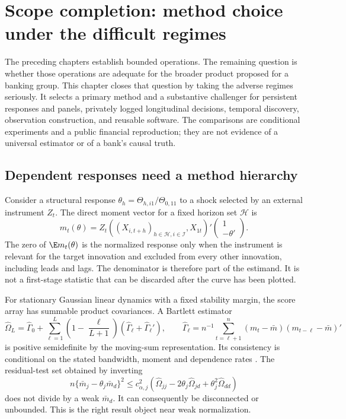 \chapter{Scope completion: method choice under the difficult regimes}
\label{ch:scope-completion}

The preceding chapters establish bounded operations. The remaining question is
whether those operations are adequate for the broader product proposed for a
banking group. This chapter closes that question by taking the adverse regimes
seriously. It selects a primary method and a substantive challenger for
persistent responses and panels, privately logged longitudinal decisions,
temporal discovery, observation construction, and reusable software. The
comparisons are conditional experiments and a public financial reproduction;
they are not evidence of a universal estimator or of a bank's causal truth.

\section{Dependent responses need a method hierarchy}
\label{s5:dependent-hierarchy}

Consider a structural response $\theta_h=\Theta_{h,i1}/\Theta_{0,11}$ to a
shock selected by an external instrument $Z_t$. The direct moment vector for a
fixed horizon set $\mathcal H$ is
\[
 m_t(\theta)=Z_t\left((X_{i,t+h})_{h\in\mathcal H,i\in\mathcal I},
 X_{1t}\right)'\begin{pmatrix}1\\-\theta'\end{pmatrix}.
\]
The zero of $\E m_t(\theta)$ is the normalized response only when the
instrument is relevant for the target innovation and excluded from every
other innovation, including leads and lags. The denominator is therefore part
of the estimand. It is not a first-stage statistic that can be discarded after
the curve has been plotted.

For stationary Gaussian linear dynamics with a fixed stability margin, the
score array has summable product covariances. A Bartlett estimator
\[
 \widehat\Omega_L=\widehat\Gamma_0+
 \sum_{\ell=1}^L\left(1-\frac{\ell}{L+1}\right)
 (\widehat\Gamma_\ell+\widehat\Gamma_\ell'),
 \qquad
 \widehat\Gamma_\ell=n^{-1}\sum_{t=\ell+1}^n
 (m_t-\bar m)(m_{t-\ell}-\bar m)'
\]
is positive semidefinite by the moving-sum representation. Its consistency is
conditional on the stated bandwidth, moment and dependence rates
\citep{newey1986}. The residual-test set obtained by inverting
\[
 n\{\bar m_j-\theta_j\bar m_d\}^2
 \leq c_{\alpha,j}^2(\widehat\Omega_{jj}-2\theta_j\widehat\Omega_{jd}
 +\theta_j^2\widehat\Omega_{dd})
\]
does not divide by a weak $\bar m_d$. It can consequently be disconnected or
unbounded. This is the right result object near weak normalization.

